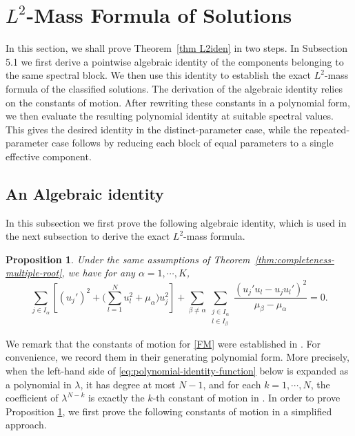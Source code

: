 \documentclass[11pt]{article}
\numberwithin{equation}{section}
\newtheorem{proposition}[theorem]{Proposition}
\theoremstyle{definition}
\begin{document}
\section{\(L^2\)-Mass Formula of Solutions}
In this section, we shall prove Theorem~\ref{thm L2iden} in two steps. In Subsection 5.1 we first derive a pointwise algebraic identity of the components belonging to the same spectral block. We then use this identity to establish the exact \(L^2\)-mass formula of the classified solutions. The derivation of the algebraic identity relies on the constants of motion. After rewriting these constants in a polynomial form, we then evaluate the resulting polynomial identity at suitable spectral values. This gives the desired identity in the distinct-parameter case, while the repeated-parameter case follows by reducing each block of equal parameters to a single effective component.


\subsection{An Algebraic identity}
In this subsection we first prove the following algebraic identity, which is used in the next subsection to derive the exact \(L^2\)-mass formula.

\begin{proposition}\label{thm:algiden}
Under the same assumptions of
Theorem~\ref{thm:completeness-multiple-root}, we have for any \(\alpha=1,\cdots,K\),
\begin{equation}\label{eq:algebraic-identity}
	\sum_{j\in I_\alpha}
	\left[
	(u_j')^2+\big(\sum_{l=1}^N u_l^2+\mu_\alpha\big)u_j^2
	\right]
	+
	\sum_{\beta\neq\alpha}
	\sum_{\substack{j\in I_\alpha\\ l\in I_\beta}}
	\frac{(u_j'u_l-u_ju_l')^2}{\mu_\beta-\mu_\alpha}
	=0 .
\end{equation}
\end{proposition}

We remark that the constants of motion for \eqref{FM} were established in
\cite{GLW2026}. For convenience, we record
them in their generating polynomial form. More precisely, when the left-hand
side of \eqref{eq:polynomial-identity-function} below is expanded as a
polynomial in \(\lambda\), it has degree at most \(N-1\), and for each
\(k=1,\cdots,N\), the coefficient of \(\lambda^{N-k}\) is exactly the
\(k\)-th constant of motion in \cite[Lemma~5.1]{GLW2026}. In order to prove Proposition \ref{thm:algiden},
we first prove the following constants of motion in a simplified approach.
\end{document}
